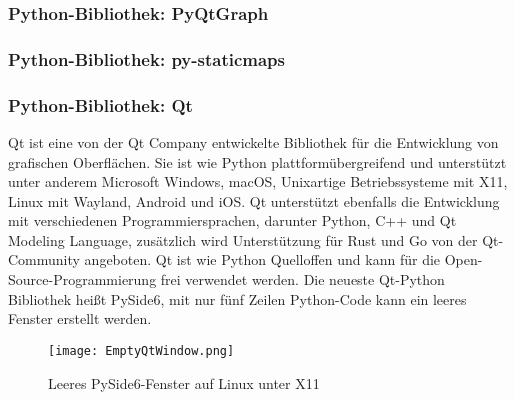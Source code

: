 \subsubsection{Python-Bibliothek: PyQtGraph}
\label{subsubsec:tPyQtGraph}

\subsubsection{Python-Bibliothek: py-staticmaps}
\label{subsubsec:tStaticmaps}

\subsubsection{Python-Bibliothek: Qt}
\label{subsubsec:tQt}
Qt ist eine von der Qt Company entwickelte Bibliothek für die Entwicklung von grafischen Oberflächen. Sie ist wie Python plattformübergreifend und unterstützt unter anderem Microsoft Windows, macOS, Unixartige Betriebssysteme mit X11, Linux mit Wayland, Android und iOS. Qt unterstützt ebenfalls die Entwicklung mit verschiedenen Programmiersprachen, darunter Python, C++ und Qt Modeling Language, zusätzlich wird Unterstützung für Rust und Go von der Qt-Community angeboten. Qt ist wie Python Quelloffen und kann für die Open-Source-Programmierung frei verwendet werden. Die neueste Qt-Python Bibliothek heißt PySide6, mit nur fünf Zeilen Python-Code kann ein leeres Fenster erstellt werden.
\begin{figure}[h]
\centering
\texttt{[image: EmptyQtWindow.png]}
\caption{Leeres PySide6-Fenster auf Linux unter X11}
\label{fig:EmptyQtWindow}
\end{figure}

